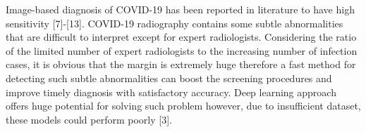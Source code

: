 \documentclass{standalone}
\begin{document}

Image-based diagnosis of COVID-19 has been reported in literature to have high sensitivity [7]-[13]. COVID-19 radiography contains some subtle abnormalities that are difficult to interpret except for expert radiologists. Considering the ratio of the limited number of expert radiologists to the increasing number of infection cases, it is obvious that the margin is extremely huge therefore a fast method for detecting such subtle abnormalities can boost the screening procedures and improve timely diagnosis with satisfactory accuracy. Deep learning approach offers huge potential for solving such problem however, due to insufficient dataset, these models could perform poorly [3]. 
\end{document}
